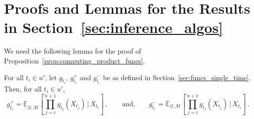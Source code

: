 \documentclass[twoside,11pt]{article}
\newcommand{\lexp}{\underline{\mathbb{E}}_{\rateset,\mathcal{M}}}
\newcommand{\uexp}{\overline{\mathbb{E}}_{\rateset,\mathcal{M}}}
\newcommand{\rateset}{\mathcal{Q}}
\begin{document}
\section{Proofs and Lemmas for the Results in Section~\ref{sec:inference_algos}}

We need the following lemma for the proof of Proposition~\ref{prop:computing_product_funcs}.
\begin{lemma}\label{lemma:product_func_induction}
For all $t_i\in u'$, let $g_{t_i}$, $g_{t_i}^+$ and $g_{t_i}^-$ be as defined in Section~\ref{sec:funcs_single_time}. Then, for all $t_i\in u'$,
\begin{equation*}
g_{t_i}^+ = \lexp\left[\prod_{j=i}^{n+1}g_{t_j}(X_{t_j})\,\vert\,X_{t_i}\right]\,, \quad\quad\text{and,} \quad\quad g_{t_i}^- = \uexp\left[\prod_{j=i}^{n+1}g_{t_j}(X_{t_j})\,\vert\,X_{t_i}\right]\,.
\end{equation*}
\end{lemma}
\end{document}
